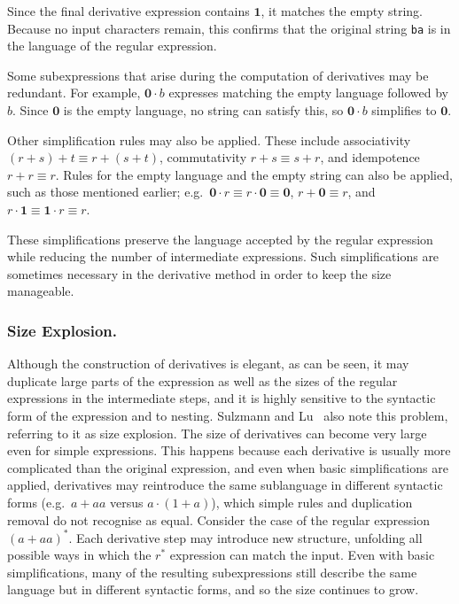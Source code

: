 \documentclass[12pt]{article}
\newcommand{\ZERO}{\textbf{0}}
\newcommand{\ONE}{\textbf{1}}
\begin{document}
Since the final derivative expression contains $\ONE$, it matches the empty
string. Because no input characters remain, this confirms that the original
string \texttt{ba} is in the language of the regular expression.

Some subexpressions that arise during the computation of derivatives may be
redundant. For example, $\ZERO \cdot b$ expresses matching the empty language
followed by $b$. Since $\ZERO$ is the empty language, no string can satisfy
this, so $\ZERO \cdot b$ simplifies to $\ZERO$.  

Other simplification rules may also be applied. These include associativity
$(r+s)+t \equiv r+(s+t)$, commutativity $r+s \equiv s+r$, and idempotence
$r+r \equiv r$. Rules for the empty language and the empty string can also be
applied, such as those mentioned earlier; e.g.\ $\ZERO \cdot r \equiv r \cdot
\ZERO \equiv \ZERO$, $r+\ZERO \equiv r$, and $r \cdot \ONE \equiv \ONE \cdot r
\equiv r$.  

These simplifications preserve the language accepted by the regular expression
while reducing the number of intermediate expressions. Such simplifications are
sometimes necessary in the derivative method in order to keep the size
manageable.

\subsubsection{Size Explosion.}  

Although the construction of derivatives is elegant, as can be seen, it may
duplicate large parts of the expression as well as the sizes of the regular
expressions in the intermediate steps, and it is highly sensitive to the
syntactic form of the expression and to nesting. Sulzmann and
Lu~\cite{Sulzmann2014} also note this problem, referring to it as size
explosion.
The size of derivatives can become very large even for simple expressions. 
This happens because each derivative is usually more complicated than the
original expression, and even when basic simplifications are applied,
derivatives may reintroduce the same sublanguage in different syntactic forms
(e.g.\ $a+aa$ versus $a \cdot (1+a)$), which simple rules and duplication
removal do not recognise as equal. Consider the case of the regular expression
$(a+aa)^*$. Each derivative step may introduce new structure, unfolding all
possible ways in which the $r^*$ expression can match the input. Even with
basic simplifications, many of the resulting subexpressions still describe the
same language but in different syntactic forms, and so the size continues to
grow.
\end{document}
